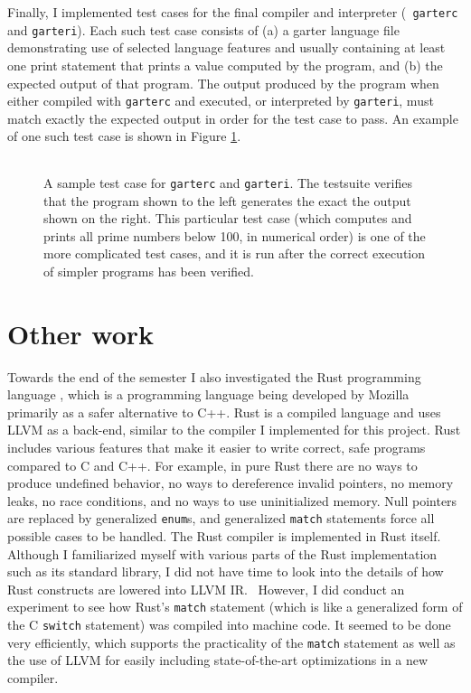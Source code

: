 \documentclass[11pt]{article}
\begin{document}
Finally, I implemented test cases for the final compiler and interpreter ({\tt
garterc} and {\tt garteri}).  Each such test case consists of (a) a garter
language file demonstrating use of selected language features and usually
containing at least one print statement that prints a value computed by the
program, and (b) the expected output of that program.  The output produced by
the program when either compiled with {\tt garterc} and executed, or interpreted
by {\tt garteri}, must match exactly the expected output in order for the test
case to pass.  An example of one such test case is shown in Figure
\ref{fig:garterc_test}.

\begin{figure}
    \begin{tabular}{|p{9cm}|p{4cm}|}
    \hline
    
    &
    
    \\ \hline
    \end{tabular}
    \caption{A sample test case for {\tt garterc} and {\tt garteri}.  The
        testsuite verifies that the program shown to the left generates the exact
        the output shown on the right.  This particular test case (which
        computes and prints all prime numbers below 100, in numerical order) is
        one of the more complicated test cases, and it is run after the correct
    execution of simpler programs has been verified.  }
    \label{fig:garterc_test}
\end{figure}

\section{Other work}

Towards the end of the semester I also investigated the Rust programming
language \cite{rust}, which is a programming language being developed by Mozilla
primarily as a safer alternative to C++.  Rust is a compiled language and uses
LLVM as a back-end, similar to the compiler I implemented for this project.
Rust includes various features that make it easier to write correct, safe
programs compared to C and C++.  For example, in pure Rust there are no ways to
produce undefined behavior, no ways to dereference invalid pointers, no memory
leaks, no race conditions, and no ways to use uninitialized memory.  Null
pointers are replaced by generalized {\tt enum}s, and generalized {\tt match}
statements force all possible cases to be handled.  The Rust compiler is
implemented in Rust itself.  Although I familiarized myself with various parts
of the Rust implementation such as its standard library, I did not have time to
look into the details of how Rust constructs are lowered into LLVM IR. \
However, I did conduct an experiment to see how Rust's {\tt match} statement
(which is like a generalized form of the C {\tt switch} statement) was compiled
into machine code.  It seemed to be done very efficiently, which supports the
practicality of the {\tt match} statement as well as the use of LLVM for easily
including state-of-the-art optimizations in a new compiler.



\end{document}
